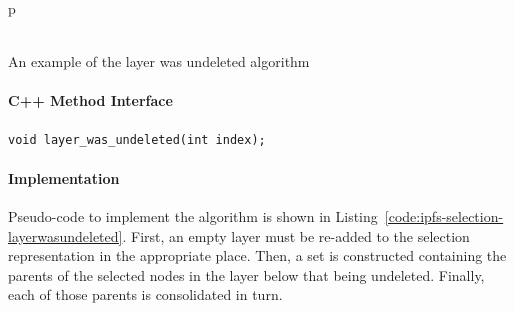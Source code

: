 \begin{stusubfig}{p}
	\\
	\\
\caption{An example of the layer was undeleted algorithm}
\label{fig:ipfs-selection-layerwasundeleted}
\end{stusubfig}

\paragraph{C++ Method Interface}

\begin{lstlisting}[style=Prototype]
void layer_was_undeleted(int index);
\end{lstlisting}

\paragraph{Implementation}

Pseudo-code to implement the algorithm is shown in Listing~\ref{code:ipfs-selection-layerwasundeleted}. First, an empty layer must be re-added to the selection representation in the appropriate place. Then, a set is constructed containing the parents of the selected nodes in the layer below that being undeleted. Finally, each of those parents is consolidated in turn.

